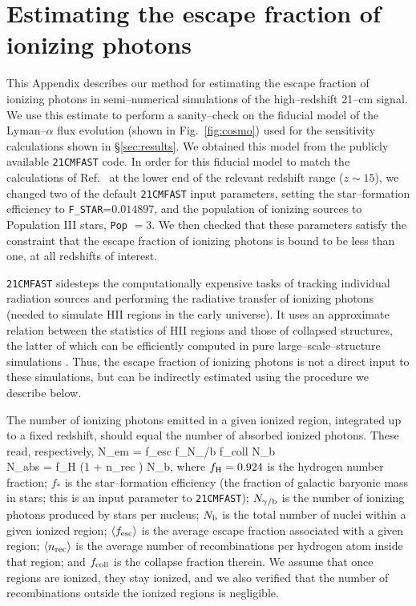 \section{Estimating the escape fraction of ionizing photons}

This Appendix describes our method for estimating the escape fraction of ionizing photons in semi--numerical simulations of the high--redshift 21--cm signal. We use this estimate to perform a sanity--check on the fiducial model of the Lyman--$\alpha$ flux evolution (shown in Fig.~\ref{fig:cosmo}) used for the sensitivity calculations shown in \S\ref{sec:results}. We obtained this model from the publicly available \texttt{21CMFAST} code. In order for this fiducial model to match the calculations of Ref.~\cite{2012ApJ...746..125H} at the lower end of the relevant redshift range ($z\sim 15$), we changed two of the default \texttt{21CMFAST} input parameters, setting the star--formation efficiency to \verb|F_STAR|=$0.014897$, and the population of ionizing sources to Population III stars, \texttt{Pop} $=3$. We then checked that these parameters satisfy the constraint that the escape fraction of ionizing photons is bound to be less than one, at all redshifts of interest. 

\texttt{21CMFAST} sidesteps the computationally expensive tasks of tracking individual radiation sources and performing the radiative transfer of ionizing photons (needed to simulate HII regions in the early universe). It uses an approximate relation between the statistics of HII regions and those of collapsed structures, the latter of which can be efficiently computed in pure large--scale--structure simulations \cite{2004ApJ...613....1F}. Thus, the escape fraction of ionizing photons is not a direct input to these simulations, but can be indirectly estimated using the procedure we describe below. 

The number of ionizing photons emitted in a given ionized region, integrated up to a fixed redshift, should equal the number of absorbed ionized photons. These read, respectively, 
\beq    
\bga
N_{\rm em} = \langle f_{\rm esc} \rangle f_\ast N_{\gamma/{\rm b}} f_{\rm coll} N_{\rm b}\\
N_{\rm abs} = f_{\rm H} (1 + \langle n_{\rm rec} \rangle) N_{\rm b},
\ega
\label{eq:pbalance}
\eeq 
where $f_{\rm H} = 0.924$ is the hydrogen number fraction; $f_\ast$ is the star--formation efficiency (the fraction of galactic baryonic mass in stars; this is an input parameter to \texttt{21CMFAST}); $N_{\gamma/{\rm b}}$ is the number of ionizing photons produced by stars per nucleus; $N_{\rm b}$ is the total number of nuclei within a given ionized region; $\langle f_{\rm esc} \rangle$ is the average escape fraction associated with a given region; $\langle n_{\rm rec} \rangle$ is the average number of recombinations per hydrogen atom inside that region; and $f_{\rm coll}$ is the collapse fraction therein. We assume that once regions are ionized, they stay ionized, and we also verified that the number of recombinations outside the ionized regions is negligible. 

